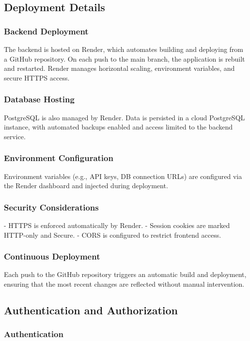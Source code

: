 \subsection{Deployment Details}

\subsubsection{Backend Deployment}
The backend is hosted on Render, which automates building and deploying from a GitHub repository. On each push to the main branch, the application is rebuilt and restarted. Render manages horizontal scaling, environment variables, and secure HTTPS access.

\subsubsection{Database Hosting}
PostgreSQL is also managed by Render. Data is persisted in a cloud PostgreSQL instance, with automated backups enabled and access limited to the backend service.

\subsubsection{Environment Configuration}
Environment variables (e.g., API keys, DB connection URLs) are configured via the Render dashboard and injected during deployment.

\subsubsection{Security Considerations}
- HTTPS is enforced automatically by Render.
- Session cookies are marked HTTP-only and Secure.
- CORS is configured to restrict frontend access.

\subsubsection{Continuous Deployment}
Each push to the GitHub repository triggers an automatic build and deployment, ensuring that the most recent changes are reflected without manual intervention.


\subsection{Authentication and Authorization}

\subsubsection{Authentication}

